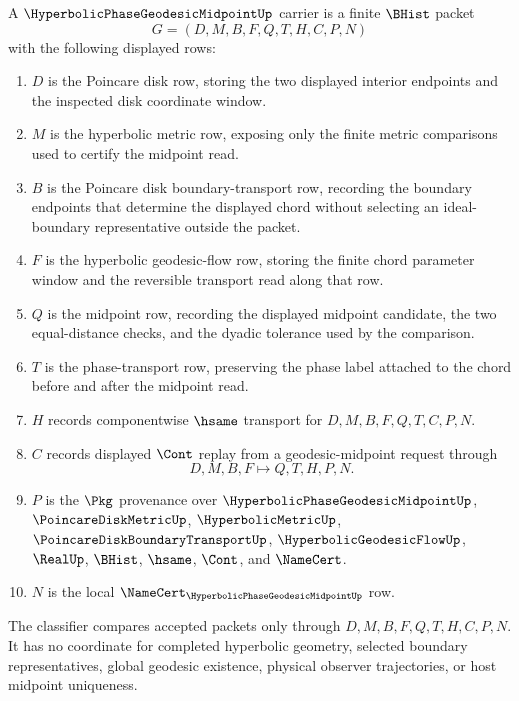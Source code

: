 \begin{definition}
\label{def:hyperbolic-phase-geodesic-midpoint-carrier}
A $\HyperbolicPhaseGeodesicMidpointUp$ carrier is a finite $\BHist$ packet
$$
G=(D,M,B,F,Q,T,H,C,P,N)
$$
with the following displayed rows:
\begin{enumerate}
\item $D$ is the Poincare disk row, storing the two displayed interior endpoints and the inspected disk coordinate window.
\item $M$ is the hyperbolic metric row, exposing only the finite metric comparisons used to certify the midpoint read.
\item $B$ is the Poincare disk boundary-transport row, recording the boundary endpoints that determine the displayed chord without selecting an ideal-boundary representative outside the packet.
\item $F$ is the hyperbolic geodesic-flow row, storing the finite chord parameter window and the reversible transport read along that row.
\item $Q$ is the midpoint row, recording the displayed midpoint candidate, the two equal-distance checks, and the dyadic tolerance used by the comparison.
\item $T$ is the phase-transport row, preserving the phase label attached to the chord before and after the midpoint read.
\item $H$ records componentwise $\hsame$ transport for $D,M,B,F,Q,T,C,P,N$.
\item $C$ records displayed $\Cont$ replay from a geodesic-midpoint request through
$$
D,M,B,F \longmapsto Q,T,H,P,N .
$$
\item $P$ is the $\Pkg$ provenance over $\HyperbolicPhaseGeodesicMidpointUp$, $\PoincareDiskMetricUp$, $\HyperbolicMetricUp$, $\PoincareDiskBoundaryTransportUp$, $\HyperbolicGeodesicFlowUp$, $\RealUp$, $\BHist$, $\hsame$, $\Cont$, and $\NameCert$.
\item $N$ is the local $\NameCert_{\HyperbolicPhaseGeodesicMidpointUp}$ row.
\end{enumerate}
The classifier compares accepted packets only through $D,M,B,F,Q,T,H,C,P,N$. It has no coordinate for completed hyperbolic geometry, selected boundary representatives, global geodesic existence, physical observer trajectories, or host midpoint uniqueness.
\end{definition}

